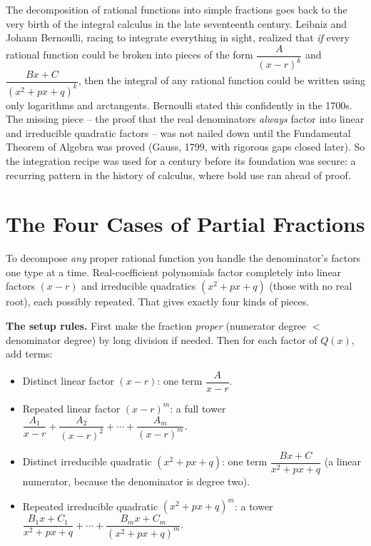\begin{historybox}
The decomposition of rational functions into simple fractions goes back to the
very birth of the integral calculus in the late seventeenth century. Leibniz
and Johann Bernoulli, racing to integrate everything in sight, realized that
\emph{if} every rational function could be broken into pieces of the form
$\dfrac{A}{(x-r)^k}$ and $\dfrac{Bx+C}{(x^2+px+q)^k}$, then the integral of any
rational function could be written using only logarithms and arctangents.
Bernoulli stated this confidently in the 1700s. The missing piece -- the proof
that the real denominators \emph{always} factor into linear and irreducible
quadratic factors -- was not nailed down until the Fundamental Theorem of
Algebra was proved (Gauss, 1799, with rigorous gaps closed later). So the
integration recipe was used for a century before its foundation was secure: a
recurring pattern in the history of calculus, where bold use ran ahead of
proof.
\end{historybox}

\section{The Four Cases of Partial Fractions}
\label{ch24:four-cases}

To decompose \emph{any} proper rational function you handle the denominator's
factors one type at a time. Real-coefficient polynomials factor completely
into linear factors $(x-r)$ and irreducible quadratics $(x^2+px+q)$ (those
with no real root), each possibly repeated. That gives exactly four kinds of
pieces.

\begin{focusbox}
\textbf{The setup rules.} First make the fraction \emph{proper} (numerator
degree $<$ denominator degree) by long division if needed. Then for each factor
of $Q(x)$, add terms:
\begin{itemize}
\item Distinct linear factor $(x-r)$: one term $\dfrac{A}{x-r}$.
\item Repeated linear factor $(x-r)^m$: a full tower
   $\dfrac{A_1}{x-r} + \dfrac{A_2}{(x-r)^2} + \cdots + \dfrac{A_m}{(x-r)^m}$.
\item Distinct irreducible quadratic $(x^2+px+q)$: one term
   $\dfrac{Bx+C}{x^2+px+q}$ (a linear numerator, because the denominator is
   degree two).
\item Repeated irreducible quadratic $(x^2+px+q)^m$: a tower
   $\dfrac{B_1x+C_1}{x^2+px+q} + \cdots + \dfrac{B_mx+C_m}{(x^2+px+q)^m}$.
\end{itemize}
\end{focusbox}

